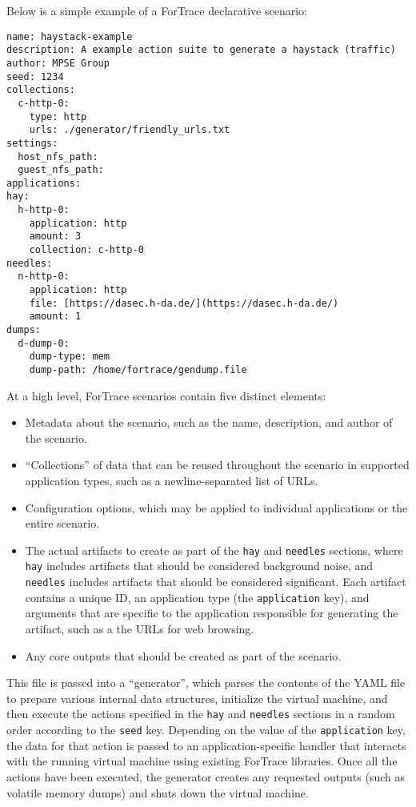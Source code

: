 \documentclass[letterpaper,12pt]{report}
\def\tightlist{}
\newcommand{\passthrough}[1]{#1}
\begin{document}
Below is a simple example of a ForTrace declarative scenario:

\begin{lstlisting}
name: haystack-example
description: A example action suite to generate a haystack (traffic)
author: MPSE Group
seed: 1234
collections:
  c-http-0:
    type: http
    urls: ./generator/friendly_urls.txt
settings:
  host_nfs_path:
  guest_nfs_path:
applications:
hay:
  h-http-0:
    application: http
    amount: 3
    collection: c-http-0
needles:
  n-http-0:
    application: http
    file: [https://dasec.h-da.de/](https://dasec.h-da.de/)
    amount: 1
dumps:
  d-dump-0:
    dump-type: mem
    dump-path: /home/fortrace/gendump.file
\end{lstlisting}

At a high level, ForTrace scenarios contain five distinct elements:

\begin{itemize}
\tightlist
\item
  Metadata about the scenario, such as the name, description, and author
  of the scenario.
\item
  ``Collections'' of data that can be reused throughout the scenario in
  supported application types, such as a newline-separated list of URLs.
\item
  Configuration options, which may be applied to individual applications
  or the entire scenario.
\item
  The actual artifacts to create as part of the
  \passthrough{\lstinline!hay!} and \passthrough{\lstinline!needles!}
  sections, where \passthrough{\lstinline!hay!} includes artifacts that
  should be considered background noise, and
  \passthrough{\lstinline!needles!} includes artifacts that should be
  considered significant. Each artifact contains a unique ID, an
  application type (the \passthrough{\lstinline!application!} key), and
  arguments that are specific to the application responsible for
  generating the artifact, such as a the URLs for web browsing.\\
\item
  Any core outputs that should be created as part of the scenario.
\end{itemize}

This file is passed into a ``generator'', which parses the contents of
the YAML file to prepare various internal data structures, initialize
the virtual machine, and then execute the actions specified in the
\passthrough{\lstinline!hay!} and \passthrough{\lstinline!needles!}
sections in a random order according to the
\passthrough{\lstinline!seed!} key. Depending on the value of the
\passthrough{\lstinline!application!} key, the data for that action is
passed to an application-specific handler that interacts with the
running virtual machine using existing ForTrace libraries. Once all the
actions have been executed, the generator creates any requested outputs
(such as volatile memory dumps) and shuts down the virtual machine.
\end{document}
